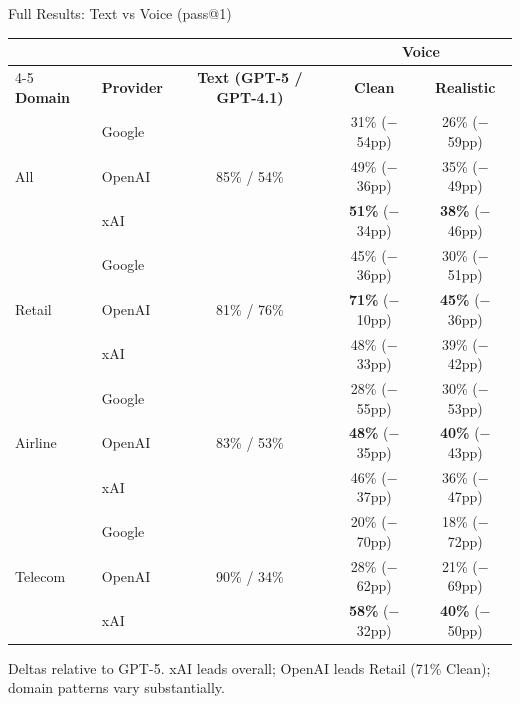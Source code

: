 \documentclass[aspectratio=169]{beamer}
\begin{document}
\begin{frame}{Full Results: Text vs Voice (pass@1)}

  \begin{center}
    \begin{scriptsize}
    \renewcommand{\arraystretch}{0.95}
    \begin{tabular}{@{}llccc@{}}
      \toprule
       & & & \multicolumn{2}{c}{\textbf{Voice}} \\
      \cmidrule(l){4-5}
      \textbf{Domain} & \textbf{Provider} & \textbf{Text (GPT-5 / GPT-4.1)} & \textbf{Clean} & \textbf{Realistic} \\
      \midrule
      \multirow{3}{*}{All} & Google & \multirow{3}{*}{85\% / 54\%} & 31\% ($-$54pp) & 26\% ($-$59pp) \\
       & OpenAI & & 49\% ($-$36pp) & 35\% ($-$49pp) \\
       & xAI & & \textbf{51\%} ($-$34pp) & \textbf{38\%} ($-$46pp) \\
      \midrule
      \multirow{3}{*}{Retail} & Google & \multirow{3}{*}{81\% / 76\%} & 45\% ($-$36pp) & 30\% ($-$51pp) \\
       & OpenAI & & \textbf{71\%} ($-$10pp) & \textbf{45\%} ($-$36pp) \\
       & xAI & & 48\% ($-$33pp) & 39\% ($-$42pp) \\
      \midrule
      \multirow{3}{*}{Airline} & Google & \multirow{3}{*}{83\% / 53\%} & 28\% ($-$55pp) & 30\% ($-$53pp) \\
       & OpenAI & & \textbf{48\%} ($-$35pp) & \textbf{40\%} ($-$43pp) \\
       & xAI & & 46\% ($-$37pp) & 36\% ($-$47pp) \\
      \midrule
      \multirow{3}{*}{Telecom} & Google & \multirow{3}{*}{90\% / 34\%} & 20\% ($-$70pp) & 18\% ($-$72pp) \\
       & OpenAI & & 28\% ($-$62pp) & 21\% ($-$69pp) \\
       & xAI & & \textbf{58\%} ($-$32pp) & \textbf{40\%} ($-$50pp) \\
      \bottomrule
    \end{tabular}
    \end{scriptsize}
  \end{center}

  {\scriptsize Deltas relative to GPT-5. xAI leads overall; OpenAI leads Retail (71\% Clean); domain patterns vary substantially.}

\end{frame}
\end{document}
